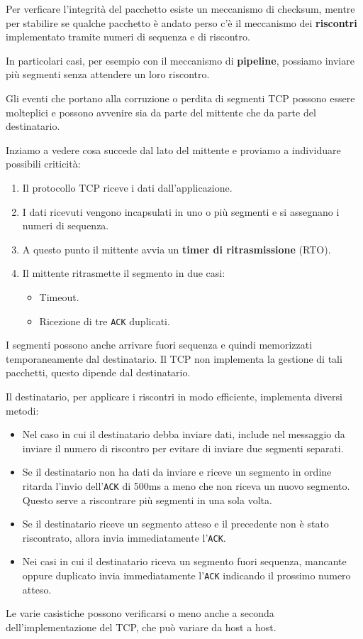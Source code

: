 Per verficare l'integrità del pacchetto esiste un meccanismo di 
checksum, mentre per stabilire se qualche pacchetto è andato perso c'è 
il meccanismo dei \textbf{riscontri} implementato tramite numeri di 
sequenza e di riscontro.

In particolari casi, per esempio con il meccanismo di 
\textbf{pipeline}, possiamo inviare più segmenti senza attendere un 
loro riscontro.

Gli eventi che portano alla corruzione o perdita di segmenti TCP 
possono essere molteplici e possono avvenire sia da parte del mittente 
che da parte del destinatario.

Inziamo a vedere cosa succede dal lato del mittente e proviamo a 
individuare possibili criticità:
\begin{enumerate}
	\item Il protocollo TCP riceve i dati dall'applicazione.
	\item I dati ricevuti vengono incapsulati in uno o più segmenti e 
		si assegnano i numeri di sequenza.
	\item A questo punto il mittente avvia un \textbf{timer di 
		ritrasmissione} (RTO).
	\item Il mittente ritrasmette il segmento in due casi:
		\begin{itemize}
			\item Timeout.
			\item Ricezione di tre \verb|ACK| duplicati.
		\end{itemize}
\end{enumerate}
I segmenti possono anche arrivare fuori sequenza e quindi memorizzati 
temporaneamente dal destinatario. Il TCP non implementa la gestione di 
tali pacchetti, questo dipende dal destinatario.

Il destinatario, per applicare i riscontri in modo efficiente, 
implementa diversi metodi:
\begin{itemize}
	\item Nel caso in cui il destinatario debba inviare dati, include 
		nel messaggio da inviare il numero di riscontro per evitare di 
		inviare due segmenti separati.
	\item Se il destinatario non ha dati da inviare e riceve un 
		segmento in ordine ritarda l'invio dell'\verb|ACK| di 500ms a 
		meno che non riceva un nuovo segmento. Questo serve a 
		riscontrare più segmenti in una sola volta.
	\item Se il destinatario riceve un segmento atteso e il precedente 
		non è stato riscontrato, allora invia immediatamente 
		l'\verb|ACK|.
	\item Nei casi in cui il destinatario riceva un segmento fuori 
		sequenza, mancante oppure duplicato invia immediatamente 
		l'\verb|ACK| indicando il prossimo numero atteso.
\end{itemize}
Le varie casistiche possono verificarsi o meno anche a seconda 
dell'implementazione del TCP, che può variare da host a host.

